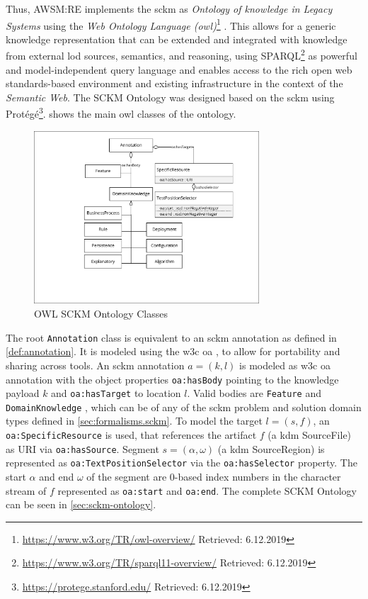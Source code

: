 Thus, AWSM:RE implements the \gls{sckm} as \emph{Ontology of knowledge in \glspl{Legacy System}} using the \emph{Web Ontology Language (\gls{owl})}\footnote{\url{https://www.w3.org/TR/owl-overview/} Retrieved: 6.12.2019} \autocite{Heil2016AWSM}.
This allows for a generic knowledge representation that can be extended and integrated with knowledge from external \gls{lod} sources, semantics, and reasoning, using SPARQL\footnote{\url{https://www.w3.org/TR/sparql11-overview/} Retrieved: 6.12.2019} as powerful and model-independent query language and enables access to the rich open \gls{web} standards-based environment and existing infrastructure in the context of the \emph{Semantic Web}.
The SCKM Ontology was designed based on the \gls{sckm} using Protégé\footnote{\url{https://protege.stanford.edu/} Retrieved: 6.12.2019}.
 shows the main \gls{owl} classes of the ontology.

\begin{figure}[h!]
\hypertarget{fig:ontology}{%
\centering
\includegraphics[width=0.75\textwidth]{../figures/awsm-re-ontology.pdf}
\caption{OWL SCKM Ontology Classes}\label{fig:ontology}
}
\end{figure}
The root \texttt{Annotation} class is equivalent to an \gls{sckm} annotation as defined in \cref{def:annotation}.
It is modeled using the \gls{w3c} \gls{oa} \autocite{W3C2017OA}, to allow for portability and sharing across tools.
An \gls{sckm} annotation \(a=(k, l)\) is modeled as \gls{w3c} \gls{oa} annotation with the object properties \texttt{oa:hasBody} pointing to the knowledge payload \(k\) and \texttt{oa:hasTarget} to location \(l\).
Valid bodies are \texttt{Feature} and \texttt{DomainKnowledge} \autocite{Heil2016AWSM}, which can be of any of the \gls{sckm} problem and solution domain types defined in \cref{sec:formalisms.sckm}.
To model the target \(l = (s,f)\), an \texttt{oa:SpecificResource} is used, that references the  \gls{artifact} \(f\) (a \gls{kdm} SourceFile) as URI via \texttt{oa:hasSource}.
Segment \(s=(\alpha, \omega)\) (a \gls{kdm} SourceRegion) is represented as \texttt{oa:TextPositionSelector} via the \texttt{oa:hasSelector} property.
The start \(\alpha\) and end \(\omega\) of the segment are 0-based index numbers in the character stream of \(f\) represented as \texttt{oa:start} and \texttt{oa:end}.
The complete SCKM Ontology can be seen in \cref{sec:sckm-ontology}.

